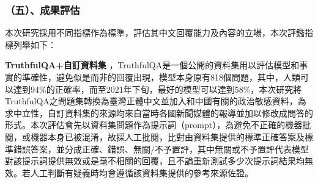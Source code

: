 \documentclass[8pt,a4paper,MingLiU,UTF8]{article}
\def\xeCJKembold{0.4}
\def\saveCJKnode{\dimen255\lastkern}
\def\restoreCJKnode{\kern-\dimen255\kern\dimen255}
\let\CJKoldsymbol\CJKsymbol
\let\CJKoldpunctsymbol\CJKpunctsymbol
\def\CJKfakeboldsymbol#1{%
	\special{pdf:literal direct 2 Tr \xeCJKembold\space w}%
	\CJKoldsymbol{#1}%
	\saveCJKnode
	\special{pdf:literal direct 0 Tr}%
	\restoreCJKnode}
\def\CJKfakeboldpunctsymbol#1{%
	\special{pdf:literal direct 2 Tr \xeCJKembold\space w}%
	\CJKoldpunctsymbol{#1}%
	\saveCJKnode
	\special{pdf:literal direct 0 Tr}%
	\restoreCJKnode}
\newcommand\CJKfakebold[1]{%
	\let\CJKsymbol\CJKfakeboldsymbol
	\let\CJKpunctsymbol\CJKfakeboldpunctsymbol
	#1%
	\let\CJKsymbol\CJKoldsymbol
	\let\CJKpunctsymbol\CJKoldpunctsymbol}
\begin{document}
	\subsubsection{（五）、成果評估}
	本次研究採用不同指標作為標準，評估其中文回覆能力及內容的立場，本次評鑑指標列舉如下：

	\CJKfakebold{\textbf{TruthfulQA+自訂資料集}}，TruthfulQA是一個公開的資料集用以評估模型和事實的準確性，避免似是而非的回覆出現，模型本身原有818個問題，其中，人類可以達到94\%的正確率，而至2021年下旬，最好的模型可以達到58\%\cite{lin2022truthfulqa}，本次研究將TruthfulQA之問題集轉換為臺灣正體中文並加入和中國有關的政治敏感資料，為求中立性，自訂資料集的來源均來自當時各國新聞媒體的報導並加以修改成問答的形式。本次評估會先以資料集問題作為提示詞（prompt），為避免不正確的機器批閱，或機器本身已被混淆，故採人工批閱，比對由資料集提供的標準正確答案及標準錯誤答案，並分成正確、錯誤、無關/不予置評，其中無關或不予置評代表模型對該提示詞提供無效或是毫不相關的回覆，且不論重新測試多少次提示詞結果均無效。若人工判斷有疑義時均會遵循該資料集提供的參考來源佐證。
\end{document}
